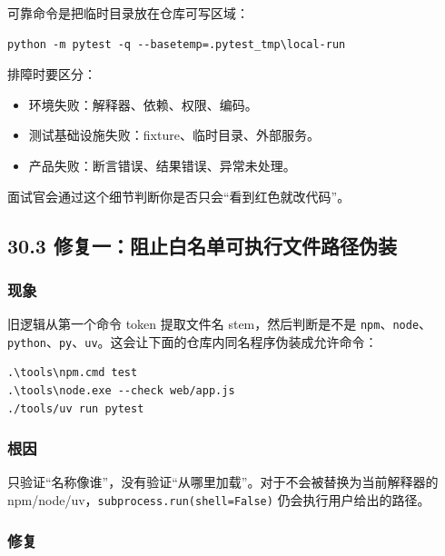 \documentclass[UTF8,12pt,openany]{ctexbook}
\begin{document}
可靠命令是把临时目录放在仓库可写区域：\par

\begin{lstlisting}
python -m pytest -q --basetemp=.pytest_tmp\local-run
\end{lstlisting}

排障时要区分：\par

\begin{itemize}
\item 环境失败：解释器、依赖、权限、编码。
\item 测试基础设施失败：fixture、临时目录、外部服务。
\item 产品失败：断言错误、结果错误、异常未处理。
\end{itemize}

面试官会通过这个细节判断你是否只会“看到红色就改代码”。\par

\subsection{30.3 修复一：阻止白名单可执行文件路径伪装}

\subsubsection{现象}

旧逻辑从第一个命令 token 提取文件名 stem，然后判断是不是 \texttt{npm}、\texttt{node}、\texttt{python}、\texttt{py}、\texttt{uv}。这会让下面的仓库内同名程序伪装成允许命令：\par

\begin{lstlisting}
.\tools\npm.cmd test
.\tools\node.exe --check web/app.js
./tools/uv run pytest
\end{lstlisting}

\subsubsection{根因}

只验证“名称像谁”，没有验证“从哪里加载”。对于不会被替换为当前解释器的 npm/node/uv，\texttt{subprocess.run(shell=False)} 仍会执行用户给出的路径。\par

\subsubsection{修复}
\end{document}
